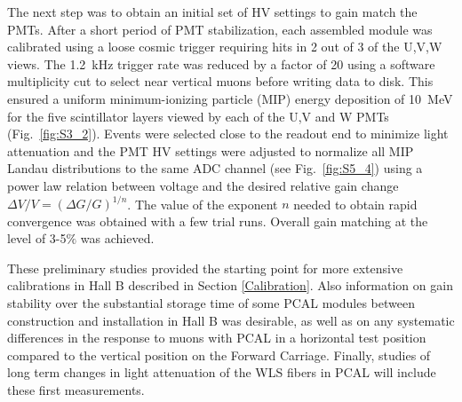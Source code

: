 The next step was to obtain an initial set of HV settings to gain match the PMTs. After a short period of PMT
stabilization, each assembled module was calibrated using a loose cosmic trigger requiring hits in 2 out of 3 of
the U,V,W views. The 1.2~kHz trigger rate was reduced by a factor of 20 using a software multiplicity cut to
select near vertical muons before writing data to disk. This ensured a uniform minimum-ionizing particle (MIP)
energy deposition of 10~MeV for the five scintillator layers viewed by each of the U,V and W PMTs (Fig.~\ref{fig:S3_2}). Events were selected
close to the readout end to minimize light attenuation and the PMT HV settings were adjusted to normalize all
MIP Landau distributions to the same ADC channel (see Fig.~\ref{fig:S5_4}) using a power law relation between
voltage and the desired relative gain change $\Delta V/V = (\Delta G/G)^{1/n}$. The value of the exponent $n$
needed to obtain rapid convergence was obtained with a few trial runs. Overall gain matching at the level of
3-5$\%$ was achieved.

These preliminary studies provided the starting point for more extensive calibrations in Hall B described in
Section \ref{Calibration}. Also information on gain stability over the substantial storage time of some PCAL
modules between construction and installation in Hall B was desirable, as well as on any systematic differences in
the response to muons with PCAL in a horizontal test position compared to the vertical position on the Forward
Carriage. Finally, studies of long term changes in light attenuation of the WLS fibers in PCAL will include these
first measurements.

